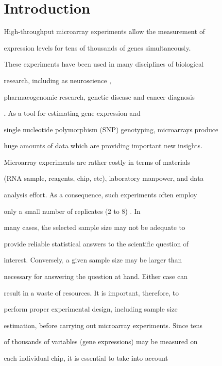 \documentclass[12pt]{article}
\begin{document}



\section{Introduction}



High-throughput microarray experiments allow the measurement of

expression levels for tens of thousands of genes simultaneously.

These experiments have been used in many disciplines of biological

research, including as neuroscience \citep{Mandel03},

pharmacogenomic research, genetic disease and cancer diagnosis

\citep{Heller02}.  As a tool for estimating gene expression and

single nucleotide polymorphism (SNP) genotyping, microarrays produce

huge amounts of data which are providing important new insights.



Microarray experiments are rather costly in terms of materials

(RNA sample, reagents, chip, etc), laboratory manpower, and data

analysis effort.  As a consequence, such experiments often employ

only a small number of replicates (2 to 8) \citep{Speed03}. In

many cases, the selected sample size may not be adequate to

provide reliable statistical answers to the scientific question of

interest. Conversely, a given sample size may be larger than

necessary for answering the question at hand. Either case can

result in a waste of resources. It is important, therefore, to

perform proper experimental design, including sample size

estimation, before carrying out microarray experiments. Since tens

of thousands of variables (gene expressions) may be measured on

each individual chip, it is essential to take into account
\end{document}
